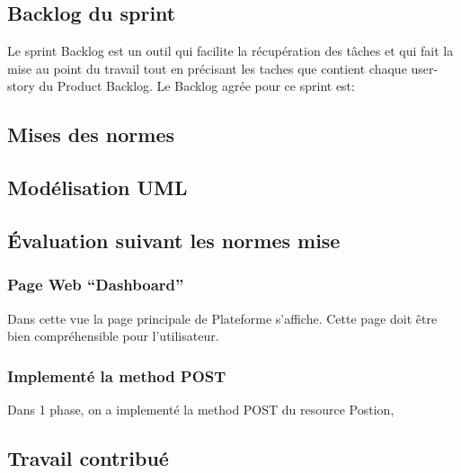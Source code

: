 \subsection{Backlog du sprint}
Le sprint Backlog est un outil qui facilite la récupération des tâches et qui fait
la mise au point du travail tout en précisant les taches que contient chaque 
user-story du Product Backlog.
Le Backlog agrée pour ce sprint est:
\subsection{Mises des normes}


\subsection{Modélisation UML}
\subsection{Évaluation suivant les normes mise}
\subsubsection{Page Web ``Dashboard''}
Dans cette vue la page principale de Plateforme s'affiche. Cette page doit être
bien compréhensible pour l'utilisateur.

\subsubsection{Implementé la method POST}
Dans 1\ier{} phase, on a implementé la method POST du resource Postion,

\subsection{Travail contribué}

